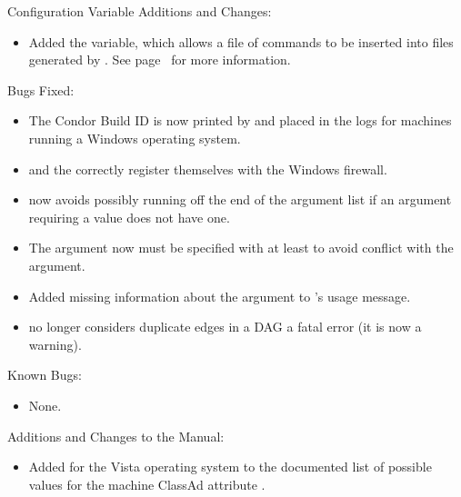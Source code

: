 \noindent Configuration Variable Additions and Changes:

\begin{itemize}

\item Added the  variable, which allows a file
  of commands to be inserted into  files generated
  by .  See page~\pageref{param:DAGManInsertSubFile}
  for more information.

\end{itemize}

\noindent Bugs Fixed:

\begin{itemize}

\item The Condor Build ID is now printed by  and placed 
  in the logs for machines running a Windows operating system.

\item {} and the  correctly register 
  themselves with the Windows firewall.

\item {} now avoids possibly running off the end
of the argument list if an argument requiring a value does not have one.

\item The   argument now must be
specified with at least  to avoid conflict with the
 argument.

\item Added missing information about the  argument to
's usage message.

\item {} no longer considers duplicate edges in a DAG a
fatal error (it is now a warning).

\end{itemize}

\noindent Known Bugs:

\begin{itemize}

\item None.

\end{itemize}

\noindent Additions and Changes to the Manual:

\begin{itemize}

\item Added  for the Vista operating system to
  the documented list of possible values for the machine ClassAd
  attribute .

\end{itemize}

